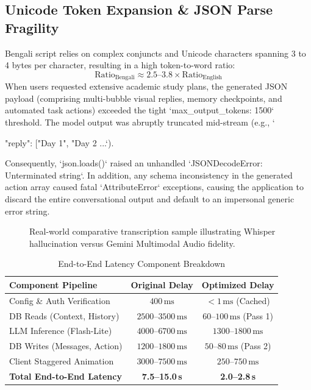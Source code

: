 \documentclass[conference]{IEEEtran}
\begin{document}
\subsection{Unicode Token Expansion \& JSON Parse Fragility}
Bengali script relies on complex conjuncts and Unicode characters spanning 3 to 4 bytes per character, resulting in a high token-to-word ratio:
\begin{equation}
\text{Ratio}_{\text{Bengali}} \approx 2.5\text{--}3.8 \times \text{Ratio}_{\text{English}}
\end{equation}
When users requested extensive academic study plans, the generated JSON payload (comprising multi-bubble visual replies, memory checkpoints, and automated task actions) exceeded the tight `max_output_tokens: 1500` threshold. The model output was abruptly truncated mid-stream (e.g., `{"reply": ["Day 1", "Day 2 ...`).

Consequently, `json.loads()` raised an unhandled `JSONDecodeError: Unterminated string`. In addition, any schema inconsistency in the generated action array caused fatal `AttributeError` exceptions, causing the application to discard the entire conversational output and default to an impersonal generic error string.

\begin{figure}[t]
\centering
{}
\caption{Real-world comparative transcription sample illustrating Whisper hallucination versus Gemini Multimodal Audio fidelity.}
\label{fig:asr_failure}
\end{figure}

\begin{table}[t]
\caption{End-to-End Latency Component Breakdown}
\label{tab:latency_breakdown}
\centering
\begin{tabular}{lcc}
\toprule
\textbf{Component Pipeline} & \textbf{Original Delay} & \textbf{Optimized Delay} \\
\midrule
Config \& Auth Verification  & $400\,\text{ms}$         & $<1\,\text{ms}$ (Cached) \\
DB Reads (Context, History)  & $2500\text{--}3500\,\text{ms}$ & $60\text{--}100\,\text{ms}$ (Pass 1) \\
LLM Inference (Flash-Lite)   & $4000\text{--}6700\,\text{ms}$ & $1300\text{--}1800\,\text{ms}$ \\
DB Writes (Messages, Action) & $1200\text{--}1800\,\text{ms}$ & $50\text{--}80\,\text{ms}$ (Pass 2) \\
Client Staggered Animation   & $3000\text{--}7500\,\text{ms}$ & $250\text{--}750\,\text{ms}$ \\
\midrule
\textbf{Total End-to-End Latency} & \textbf{7.5--15.0\,s}   & \textbf{2.0--2.8\,s} \\
\bottomrule
\end{tabular}
\end{table}

}
\end{document}
